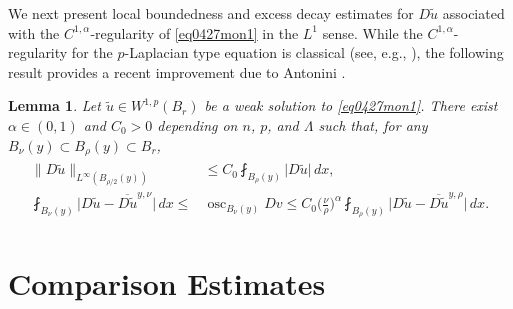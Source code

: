 \documentclass[reqno]{amsart}
\numberwithin{equation}{section}
\theoremstyle{plain}
\newtheorem{lemma}[theorem]{Lemma}
\theoremstyle{definition}
\theoremstyle{remark}
\DeclareMathOperator{\osc}{osc}
\providecommand{\abs}[1]{\lvert#1\rvert}
\providecommand{\norm}[1]{\lVert#1\rVert}
\begin{document}
 
 

We next present local boundedness and excess decay estimates for $D\tilde{u}$ associated with the $C^{1,\alpha}$-regularity of \eqref{eq0427mon1} in the $L^1$ sense. While the $C^{1,\alpha}$-regularity for the $p$-Laplacian type equation is classical (see, e.g., \cite{Evans82, DiBenedetto83}), the following result provides a recent improvement due to Antonini \cite[Theorem~4.1]{Antonini26}.

 
 
\begin{lemma}\label{lem:C1alpha}
 Let $\tilde{u}\in W^{1,p}(B_r)$ be a weak solution to \eqref{eq0427mon1}.  There exist $\alpha\in (0,1)$ and $C_0>0$ depending on $n$, $p$, and $\Lambda$ such that, for any $B_{\nu}(y)\subset B_\rho(y)\subset B_r$, 
\begin{align} \label{eq0331tue2}
\begin{split}
\norm{D\tilde{u}}_{L^\infty(B_{\rho/2}(y))} &\leq C_0\fint_{B_\rho(y)}\abs{D\tilde{u}}\,dx,\\
\fint_{B_\nu(y)} \abs{ D\tilde{u}- \overline{D\tilde{u}}^{y,\nu}}\,dx\leq &\osc_{B_\nu(y)} Dv  \leq C_0\bigg(\frac{\nu}{\rho}\bigg)^\alpha \fint_{B_\rho(y)} \abs{ D\tilde{u}- \overline{D\tilde{u}}^{y,\rho}}\,dx.
\end{split}
\end{align}
\end{lemma}




 
\section{Comparison Estimates}  \label{sec3}


 
\end{document}
